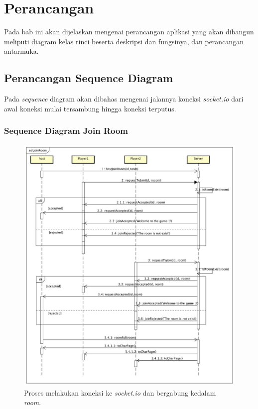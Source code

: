 \chapter{Perancangan}
\label{chap:perancangan}

Pada bab ini akan dijelaskan mengenai perancangan aplikasi yang akan dibangun meliputi diagram kelas rinci beserta deskripsi dan fungsinya, dan perancangan antarmuka.

\section{Perancangan Sequence Diagram}

Pada \textit{sequence} diagram akan dibahas mengenai jalannya koneksi \textit{socket.io} dari awal koneksi mulai tersambung hingga koneksi terputus.

\subsection{Sequence Diagram Join Room}

\begin{figure}[H]
	\centering
	\includegraphics[scale=0.2]{Gambar/JoinRoom}
	\caption{Proses melakukan koneksi ke \textit{socket.io} dan bergabung kedalam \textit{room}.}
	\label{fig:1_JoinRoom}
\end{figure}

